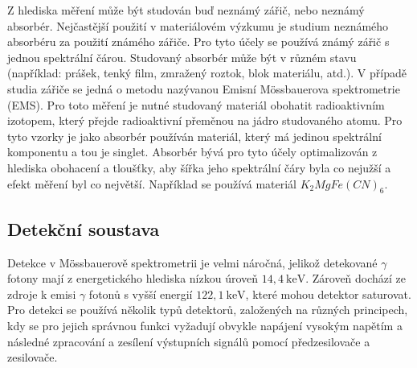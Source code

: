 \documentclass[../../main.tex]{subfiles}
\begin{document}
Z hlediska měření může být studován buď neznámý zářič, nebo neznámý absorbér. Nejčastější použití v materiálovém výzkumu je studium neznámého absorbéru za použití známého zářiče. Pro tyto účely se používá známý zářič s jednou spektrální čárou. Studovaný absorbér může být v různém stavu (například: prášek, tenký film, zmražený roztok, blok materiálu, atd.). V případě studia zářiče se jedná o metodu nazývanou Emisní Mössbauerova spektrometrie (EMS). Pro toto měření je nutné studovaný materiál obohatit radioaktivním izotopem, který přejde radioaktivní přeměnou na jádro studovaného atomu. Pro tyto vzorky je jako absorbér používán materiál, který má jedinou spektrální komponentu a tou je singlet. Absorbér bývá pro tyto účely optimalizován z hlediska obohacení a tloušťky, aby šířka jeho spektrální čáry byla co nejužší a efekt měření byl co největší. Například se používá materiál $K_2 Mg Fe(CN)_6$.


\subsection{Detekční soustava}

Detekce v Mössbauerově spektrometrii je velmi náročná, jelikož detekované $\gamma$ fotony mají z energetického hlediska nízkou úroveň $14,4 ~\mathrm{keV}$. Zároveň dochází ze zdroje k emisi $\gamma$ fotonů s vyšší energií $122,1 ~\mathrm{keV}$, které mohou detektor saturovat. Pro detekci se používá několik typů detektorů, založených na různých principech, kdy se pro jejich správnou funkci vyžadují obvykle napájení vysokým napětím a následné zpracování a zesílení výstupních signálů pomocí předzesilovače a zesilovače.
\end{document}
